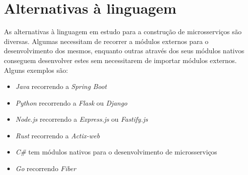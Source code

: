\section{Alternativas à linguagem}

As alternativas à linguagem em estudo para a construção de microsserviços são diversas. Algumas necessitam de recorrer a módulos externos para o desenvolvimento dos mesmos, enquanto outras através dos seus módulos nativos conseguem desenvolver estes sem necessitarem de importar módulos externos. Alguns exemplos são:
\begin{itemize}
    \item \textit{Java} recorrendo a \textit{Spring Boot} \cite{springBoot}
    \item \textit{Python} recorrendo a \textit{Flask} \cite{flask} ou \textit{Django} \cite{django}
    \item \textit{Node.js} recorrendo a \textit{Express.js} \cite{express} ou \textit{Fastify.js} \cite{fastify}
    \item \textit{Rust} recorrendo a \textit{Actix-web} \cite{actix}
    \item \textit{C\#} tem módulos nativos para o desenvolvimento de microsserviços \cite{csharp}
    \item \textit{Go} recorrendo \textit{Fiber} \cite{fiber}
\end{itemize}

